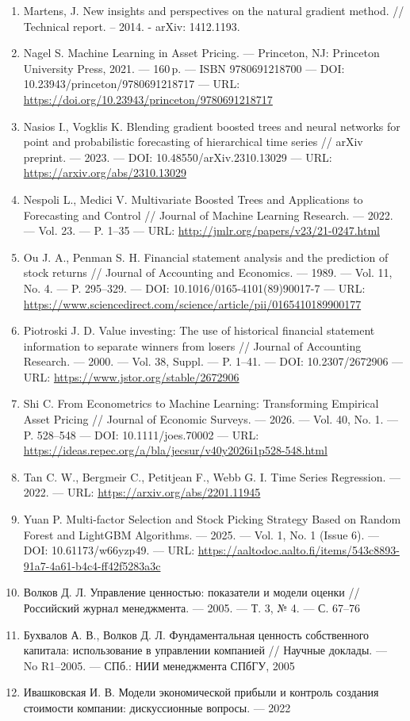 \documentclass[
]{article}
\begin{document}
\begin{enumerate}
\item
  Martens, J. New insights and perspectives on the natural gradient method. // Technical report. -- 2014. - arXiv: 1412.1193.
\item
  Nagel S. Machine Learning in Asset Pricing. --- Princeton, NJ: Princeton University Press, 2021. --- 160\,p. --- ISBN 9780691218700 --- DOI: 10.23943/princeton/9780691218717 --- URL: \url{https://doi.org/10.23943/princeton/9780691218717}
\item
  Nasios I., Vogklis K. Blending gradient boosted trees and neural networks for point and probabilistic forecasting of hierarchical time series // arXiv preprint. --- 2023. --- DOI: 10.48550/arXiv.2310.13029 --- URL: \url{https://arxiv.org/abs/2310.13029}
\item
  Nespoli L., Medici V. Multivariate Boosted Trees and Applications to Forecasting and Control // Journal of Machine Learning Research. --- 2022. --- Vol. 23. --- P. 1--35 --- URL: \url{http://jmlr.org/papers/v23/21-0247.html}
\item
  Ou J. A., Penman S. H. Financial statement analysis and the prediction of stock returns // Journal of Accounting and Economics. --- 1989. --- Vol. 11, No. 4. --- P. 295--329. --- DOI: 10.1016/0165-4101(89)90017-7 --- URL: \url{https://www.sciencedirect.com/science/article/pii/0165410189900177}
\item
  Piotroski J. D. Value investing: The use of historical financial statement information to separate winners from losers // Journal of Accounting Research. --- 2000. --- Vol. 38, Suppl. --- P. 1--41. --- DOI: 10.2307/2672906 --- URL: \url{https://www.jstor.org/stable/2672906}
\item
  Shi C. From Econometrics to Machine Learning: Transforming Empirical Asset Pricing // Journal of Economic Surveys. --- 2026. --- Vol. 40, No. 1. --- P. 528--548 --- DOI: 10.1111/joes.70002 --- URL: \url{https://ideas.repec.org/a/bla/jecsur/v40y2026i1p528-548.html}
\item
  Tan C. W., Bergmeir C., Petitjean F., Webb G. I. Time Series Regression. --- 2022. --- URL: \url{https://arxiv.org/abs/2201.11945}
\item
  Yuan P. Multi-factor Selection and Stock Picking Strategy Based on Random Forest and LightGBM Algorithms. --- 2025. --- Vol. 1, No. 1 (Issue 6). --- DOI: 10.61173/w66yzp49. --- URL: \url{https://aaltodoc.aalto.fi/items/543c8893-91a7-4a61-b4c4-ff42f5283a3c}
\item
  Волков Д. Л. Управление ценностью: показатели и модели оценки // Российский журнал менеджмента. --- 2005. --- Т. 3, № 4. --- С. 67--76
\item
  Бухвалов А. В., Волков Д. Л. Фундаментальная ценность собственного капитала: использование в управлении компанией // Научные доклады. --- No R1--2005. --- СПб.: НИИ менеджмента СПбГУ, 2005
\item
  Ивашковская И. В. Модели экономической прибыли и контроль создания стоимости компании: дискуссионные вопросы. --- 2022
\end{enumerate}
\end{document}
